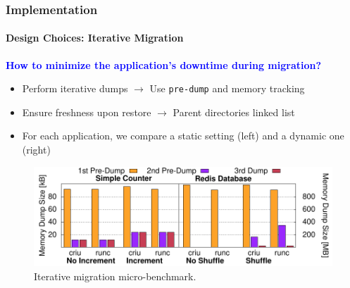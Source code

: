 \documentclass[9pt,    %
    english,            %
    xcolor=table,       %
    envcountsect,        %
    aspectratio=169     %
]{beamer}
\begin{document}
\begin{frame}
    \frametitle{Implementation}
    \framesubtitle{Design Choices: Iterative Migration}

    \vspace{10pt}

    \textbf{\textcolor{blue}{How to minimize the application's downtime during migration?}}
    \begin{itemize}
        \item Perform iterative dumps $\rightarrow$ Use \texttt{pre-dump} and memory tracking
        \item Ensure freshness upon restore $\rightarrow$ Parent directories linked list
        \item For each application, we compare a static setting (left) and a dynamic one (right)
    \end{itemize}

    \vspace{-5pt}

    \begin{figure}
        \centering
        \includegraphics[width=.75\textwidth]{./figs/iterative_migration_microbenchmark.pdf}
        \caption{Iterative migration micro-benchmark.\label{fig:iterative-microbecnhmark}}
    \end{figure}
    
\end{frame}
\end{document}
